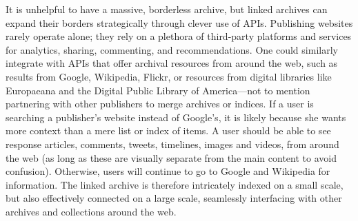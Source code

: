 It is unhelpful to have a massive, borderless archive, but linked archives can expand their borders strategically through clever use of APIs. Publishing websites rarely operate alone; they rely on a plethora of third-party platforms and services for analytics, sharing, commenting, and recommendations. One could similarly integrate with APIs that offer archival resources from around the web, such as results from Google, Wikipedia, Flickr, or resources from digital libraries like Europaeana and the Digital Public Library of America---not to mention partnering with other publishers to merge archives or indices. If a user is searching a publisher's website instead of Google's, it is likely because she wants more context than a mere list or index of items. A user should be able to see response articles, comments, tweets, timelines, images and videos, from around the web (as long as these are visually separate from the main content to avoid confusion). Otherwise, users will continue to go to Google and Wikipedia for information. The linked archive is therefore intricately indexed on a small scale, but also effectively connected on a large scale, seamlessly interfacing with other archives and collections around the web.





